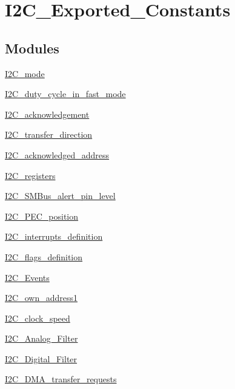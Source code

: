 \hypertarget{group___i2_c___exported___constants}{\section{I2\-C\-\_\-\-Exported\-\_\-\-Constants}
\label{group___i2_c___exported___constants}
}
\subsection*{Modules}
\begin{DoxyCompactItemize}
\item 
\hyperlink{group___i2_c__mode}{I2\-C\-\_\-mode}
\item 
\hyperlink{group___i2_c__duty__cycle__in__fast__mode}{I2\-C\-\_\-duty\-\_\-cycle\-\_\-in\-\_\-fast\-\_\-mode}
\item 
\hyperlink{group___i2_c__acknowledgement}{I2\-C\-\_\-acknowledgement}
\item 
\hyperlink{group___i2_c__transfer__direction}{I2\-C\-\_\-transfer\-\_\-direction}
\item 
\hyperlink{group___i2_c__acknowledged__address}{I2\-C\-\_\-acknowledged\-\_\-address}
\item 
\hyperlink{group___i2_c__registers}{I2\-C\-\_\-registers}
\item 
\hyperlink{group___i2_c___s_m_bus__alert__pin__level}{I2\-C\-\_\-\-S\-M\-Bus\-\_\-alert\-\_\-pin\-\_\-level}
\item 
\hyperlink{group___i2_c___p_e_c__position}{I2\-C\-\_\-\-P\-E\-C\-\_\-position}
\item 
\hyperlink{group___i2_c__interrupts__definition}{I2\-C\-\_\-interrupts\-\_\-definition}
\item 
\hyperlink{group___i2_c__flags__definition}{I2\-C\-\_\-flags\-\_\-definition}
\item 
\hyperlink{group___i2_c___events}{I2\-C\-\_\-\-Events}
\item 
\hyperlink{group___i2_c__own__address1}{I2\-C\-\_\-own\-\_\-address1}
\item 
\hyperlink{group___i2_c__clock__speed}{I2\-C\-\_\-clock\-\_\-speed}
\item 
\hyperlink{group___i2_c___analog___filter}{I2\-C\-\_\-\-Analog\-\_\-\-Filter}
\item 
\hyperlink{group___i2_c___digital___filter}{I2\-C\-\_\-\-Digital\-\_\-\-Filter}
\item 
\hyperlink{group___i2_c___d_m_a__transfer__requests}{I2\-C\-\_\-\-D\-M\-A\-\_\-transfer\-\_\-requests}

\end{DoxyCompactItemize}
